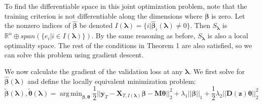 \documentclass[10pt,letterpaper]{article}
\DeclareMathOperator*{\argmin}{arg\,min}
\begin{document}
To find the differentiable space in this joint optimization problem, note that the training criterion is not differentiable along the dimensions where $\boldsymbol\beta$ is zero. Let the nonzero indices of $\hat{\boldsymbol{\beta}}$ be denoted $I(\boldsymbol\lambda) = \{i | \hat{\boldsymbol{\beta}}_i(\boldsymbol\lambda) \ne 0\}$. Then $S_{\boldsymbol{\lambda}}$ is $\mathbb{R}^n \oplus span(\{e_i | i \in I(\boldsymbol\lambda)\})$. By the same reasoning as before, $S_{\boldsymbol{\lambda}}$ is also a local optimality space. The rest of the conditions in Theorem 1 are also satisfied, so we can solve this problem using gradient descent.

We now calculate the gradient of the validation loss at any $\boldsymbol{\lambda}$. We first solve for $\hat{\boldsymbol{\beta}}(\boldsymbol{\lambda})$ and define the locally equivalent minimization problem:
\begin{equation}
\tilde{\boldsymbol{\beta}}(\boldsymbol{\lambda}),
\tilde{\boldsymbol{\theta}}(\boldsymbol{\lambda}) =
\argmin_{\boldsymbol\beta, \boldsymbol{\theta}}
\frac{1}{2} \bigl\lvert\bigl\lvert
\boldsymbol{y}_T
- \boldsymbol{X}_{T, I(\boldsymbol \lambda)}\boldsymbol{\beta}
- \boldsymbol{M} \boldsymbol{\theta} \bigl\rvert\bigl\rvert^2_2
+ \lambda_1 \lvert\lvert \boldsymbol{\beta}
\rvert \rvert_1
+ \frac{1}{2} \lambda_2 \lvert\lvert \boldsymbol{D}(\boldsymbol{z}) \boldsymbol{\theta} \rvert \rvert_2^2
\label{aplmRestricted}
\end{equation}
\end{document}
